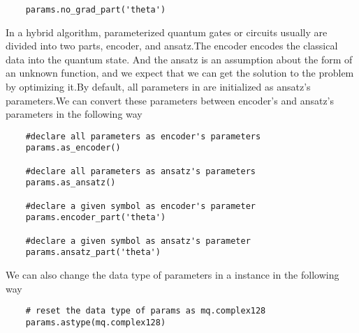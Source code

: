 \begin{lstlisting}
    params.no_grad_part('theta')
\end{lstlisting}

In a hybrid algorithm, parameterized quantum gates or circuits usually are divided into two parts, encoder, and ansatz.The encoder encodes the classical data into the quantum state. And the ansatz is an assumption about the form of an unknown function, and we expect that we can get the solution to the problem by optimizing it.By default, all parameters in \ParameterResolver are initialized as ansatz's parameters.We can convert these parameters between encoder's and ansatz's parameters in the following way

\begin{lstlisting}
    #declare all parameters as encoder's parameters
    params.as_encoder()

    #declare all parameters as ansatz's parameters
    params.as_ansatz()

    #declare a given symbol as encoder's parameter
    params.encoder_part('theta')

    #declare a given symbol as ansatz's parameter
    params.ansatz_part('theta')

\end{lstlisting}

We can also change the data type of parameters in a \ParameterResolver instance in the following way
\begin{lstlisting}
    # reset the data type of params as mq.complex128
    params.astype(mq.complex128)
\end{lstlisting}

